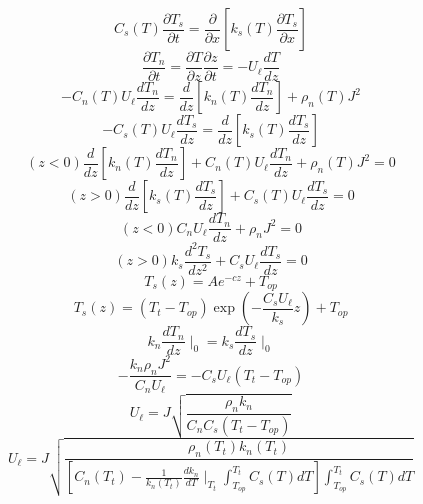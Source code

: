 \begin{equation}%
C_s(T)\frac{\partial T_s}{\partial t}=\frac{\partial}{\partial x}\left[k_s(T)\frac{\partial T_s}{\partial x}\right]
\end{equation}
\begin{equation}%
\frac{\partial T_n}{\partial t}=\frac{\partial T}{\partial z}\frac{\partial z}{\partial t}=-U_\ell\frac{dT}{dz}
\end{equation}
\begin{equation}%
-C_n(T)U_\ell\frac{dT_n}{dz}=\frac{d}{dz}\left[k_n(T)\frac{dT_n}{dz}\right]+\rho_n(T)J^2
\end{equation}
\begin{equation}%
-C_s(T)U_\ell\frac{dT_s}{dz}=\frac{d}{dz}\left[k_s(T)\frac{dT_s}{dz}\right]
\end{equation}
\begin{equation}%
(z<0)      \frac{d}{dz}\left[k_n(T)\frac{dT_n}{dz}\right]+C_n(T)U_\ell\frac{dT_n}{dz}+\rho_n(T)J^2=0
\end{equation}
\begin{equation}%
(z>0)      \frac{d}{dz}\left[k_s(T)\frac{dT_s}{dz}\right]+C_s(T)U_\ell\frac{dT_s}{dz}=0
\end{equation}
\begin{equation}%
(z<0)      C_nU_\ell\frac{dT_n}{dz}+\rho_nJ^2=0
\end{equation}
\begin{equation}%
(z>0)     k_s\frac{d^2T_s}{dz^2}+C_sU_\ell\frac{dT_s}{dz}=0
\end{equation}
\begin{equation}%
T_s(z)=Ae^{-cz}+T_{op}
\end{equation}
\begin{equation}%
T_s(z)=(T_t-T_{op})\exp\left(-\frac{C_sU_\ell}{k_s}z\right)+T_{op}
\end{equation}
\begin{equation}%
k_n\frac{dT_n}{dz}\mid_0=k_s\frac{dT_s}{dz}\mid_0
\end{equation}
\begin{equation}%
-\frac{k_n\rho_nJ^2}{C_nU_\ell}=-C_sU_\ell(T_t-T_{op})
\end{equation}
\begin{equation}%
U_\ell=J\sqrt{\frac{\rho_nk_n}{C_nC_s(T_t-T_{op})}}
\end{equation}
\begin{equation}%
U_\ell=J\sqrt{\frac{\rho_n(T_t)k_n(T_t)}{\left[C_n(T_t)-\frac{1}{k_n(T_t)}\frac{dk_n}{dT}\mid_{T_t}\int_{T_{op}}^{T_t}C_s(T)dT\right]\int_{T_{op}}^{T_t}C_s(T)dT}}
\end{equation}
